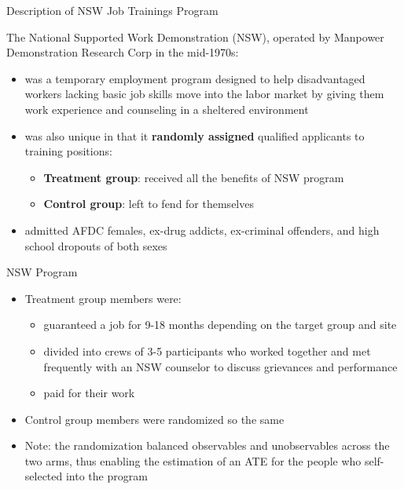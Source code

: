 \documentclass{beamer}
\begin{document}
\begin{frame}{Description of NSW Job Trainings Program}
	
The National Supported Work Demonstration (NSW), operated by Manpower Demonstration Research Corp in the mid-1970s:
	\begin{itemize}
	\item was a temporary employment program designed to help disadvantaged workers lacking basic job skills move into the labor market by giving them work experience and counseling in a sheltered environment
	\item was also unique in that it \textbf{randomly assigned} qualified applicants to training positions:
		\begin{itemize}
		\item \textbf{Treatment group}: received all the benefits of NSW program
		\item \textbf{Control group}: left to fend for themselves
		\end{itemize}
	\item admitted AFDC females, ex-drug addicts, ex-criminal offenders, and high school dropouts of both sexes
	\end{itemize}
\end{frame}

\begin{frame}{NSW Program}
	
	\begin{itemize}
	\item Treatment group members were:
		\begin{itemize}
		\item guaranteed a job for 9-18 months depending on the target group and site
		\item divided into crews of 3-5 participants who worked together and met frequently with an NSW counselor to discuss grievances and performance
		\item paid for their work
		\end{itemize}
	\item Control group members were randomized so the same
	\item Note: the randomization balanced observables and unobservables across the two arms, thus enabling the estimation of an ATE for the people who self-selected into the program
	\end{itemize}
\end{frame}
\end{document}
